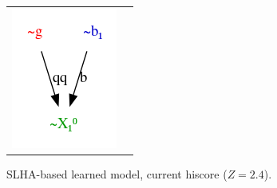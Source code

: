 \documentclass[11pt,singleside,a4paper,makeidx,notitlepage]{article}
\begin{document}
\begin{figure}[h!t]
\begin{center}
\begin{tabular}{cc}
\includegraphics[width=.49\textwidth]{hiscore.png}
\end{tabular}
\caption{SLHA-based learned model, current hiscore ($Z=2.4$).}
\label{fig_hiscore}
\end{center}
\end{figure}

%
% 
\end{document}

